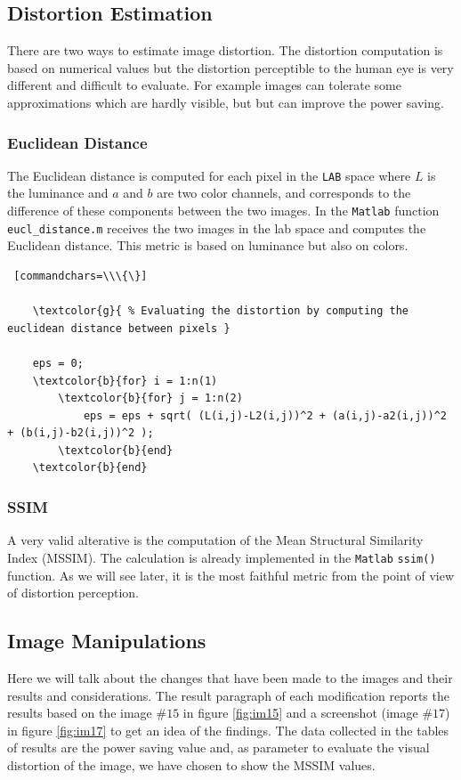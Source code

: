 \documentclass[a4paper]{article}
\begin{document}
    \subsection{Distortion Estimation}
    There are two ways to estimate image distortion. The distortion computation is based on numerical values but the distortion perceptible to the human eye is very different and difficult to evaluate. For example images can tolerate some approximations which are hardly visible, but but can improve the power saving.
        \subsubsection{Euclidean Distance}
The Euclidean distance is computed for each pixel in the \texttt{LAB} space where $L$ is the luminance and $a$ and $b$ are two color channels, and corresponds to the difference of these components between the two images.
In the \texttt{Matlab} function \texttt{eucl\_distance.m} receives the two images in the lab space and computes the Euclidean distance. This metric is based on luminance but also on colors.

\begin{Verbatim} [commandchars=\\\{\}]

    \textcolor{g}{ % Evaluating the distortion by computing the euclidean distance between pixels }

    eps = 0;
    \textcolor{b}{for} i = 1:n(1)
        \textcolor{b}{for} j = 1:n(2)
            eps = eps + sqrt( (L(i,j)-L2(i,j))^2 + (a(i,j)-a2(i,j))^2 + (b(i,j)-b2(i,j))^2 );
        \textcolor{b}{end}
    \textcolor{b}{end}

\end{Verbatim}

        \subsubsection{SSIM}
A very valid alterative is the computation of the Mean Structural Similarity Index (MSSIM). The calculation is already implemented in the \texttt{Matlab} \texttt{ssim()} function. As we will see later, it is the most faithful metric from the point of view of distortion perception.

    \subsection{Image Manipulations}
        Here we will talk about the changes that have been made to the images and their results and considerations.
        The result paragraph of each modification reports the results based on the image $\#15$ in figure \ref{fig:im15} and a screenshot (image $\#17$) in figure \ref{fig:im17} to get an idea of the findings. The data collected in the tables of results are the power saving value and, as parameter to evaluate the visual distortion of the image, we have chosen to show the MSSIM values.
\end{document}

